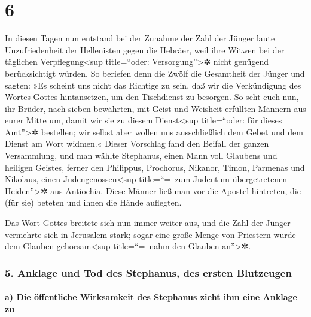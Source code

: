 \hypertarget{section-5}{%
\section{6}\label{section-5}}

 In diesen Tagen nun entstand bei der Zunahme der Zahl der
Jünger laute Unzufriedenheit der Hellenisten gegen die Hebräer, weil
ihre Witwen bei der täglichen Verpflegung\textless sup title=``oder:
Versorgung''\textgreater✲ nicht genügend berücksichtigt würden.
 So beriefen denn die Zwölf die Gesamtheit der Jünger und
sagten: »Es scheint uns nicht das Richtige zu sein, daß wir die
Verkündigung des Wortes Gottes hintansetzen, um den Tischdienst zu
besorgen.  So seht euch nun, ihr Brüder, nach sieben
bewährten, mit Geist und Weisheit erfüllten Männern aus eurer Mitte um,
damit wir sie zu diesem Dienst\textless sup title=``oder: für dieses
Amt''\textgreater✲ bestellen;  wir selbst aber wollen uns
ausschließlich dem Gebet und dem Dienst am Wort widmen.« 
Dieser Vorschlag fand den Beifall der ganzen Versammlung, und man wählte
Stephanus, einen Mann voll Glaubens und heiligen Geistes, ferner den
Philippus, Prochorus, Nikanor, Timon, Parmenas und Nikolaus, einen
Judengenossen\textless sup title=``=~zum Judentum übergetretenen
Heiden''\textgreater✲ aus Antiochia.  Diese Männer ließ
man vor die Apostel hintreten, die (für sie) beteten und ihnen die Hände
auflegten.

 Das Wort Gottes breitete sich nun immer weiter aus, und
die Zahl der Jünger vermehrte sich in Jerusalem stark; sogar eine große
Menge von Priestern wurde dem Glauben gehorsam\textless sup
title=``=~nahm den Glauben an''\textgreater✲.

\hypertarget{anklage-und-tod-des-stephanus-des-ersten-blutzeugen}{%
\subsubsection{5. Anklage und Tod des Stephanus, des ersten
Blutzeugen}\label{anklage-und-tod-des-stephanus-des-ersten-blutzeugen}}

\hypertarget{a-die-uxf6ffentliche-wirksamkeit-des-stephanus-zieht-ihm-eine-anklage-zu}{%
\paragraph{a) Die öffentliche Wirksamkeit des Stephanus zieht ihm eine
Anklage
zu}\label{a-die-uxf6ffentliche-wirksamkeit-des-stephanus-zieht-ihm-eine-anklage-zu}}


